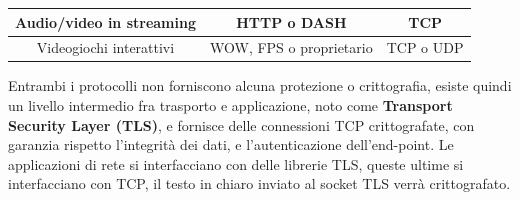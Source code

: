 \documentclass[12pt, letterpaper]{article}
\begin{document}
\begin{center}
\begin{tabular}{|c|c|c|}
        Audio/video in streaming & HTTP o DASH                                                                          & TCP                                                                                  \\ \hline
        \rowcolor[HTML]{EFEFEF} 
        Videogiochi interattivi  & WOW, FPS o proprietario                                                              & \cellcolor[HTML]{EFEFEF}TCP o UDP                                                    \\ \hline
        \end{tabular}
\end{center}
Entrambi i protocolli non forniscono alcuna protezione o crittografia, esiste quindi un livello 
intermedio fra trasporto e applicazione, noto come \textbf{Transport Security Layer (TLS)}, e fornisce 
delle connessioni TCP crittografate, con garanzia rispetto l'integrità dei dati, e l'autenticazione 
dell'end-point. Le applicazioni di rete si interfacciano con delle librerie TLS, queste ultime si 
interfacciano con TCP, il testo in chiaro inviato al socket TLS verrà crittografato.
\end{document}

